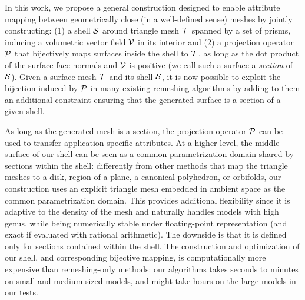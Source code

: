 In this work, we propose a general construction designed to enable attribute mapping between geometrically close (in a well-defined sense) meshes by jointly constructing: (1) a shell $\S$ around triangle mesh $\T$ spanned by a set of prisms, inducing a volumetric vector field $\V$ in its interior and (2) a projection operator $\P$ that bijectively maps surfaces inside the shell to $\T$, as long as the dot product of the surface face normals and $\V$ is positive
(we call such a surface a \emph{section} of $\S$).
Given a surface mesh $\T$ and its shell $\S$, it is now possible to exploit the bijection induced by $\P$ in many existing remeshing algorithms by adding to them an additional constraint ensuring that the generated surface is a section of a given shell.

As long as the generated mesh is a section, the projection operator $\P$ can be used to transfer application-specific attributes. At a higher level, the middle surface of our shell can be seen as a common parametrization domain shared by sections within the shell: differently from other methods that map the triangle meshes to a disk, region of a plane, a canonical polyhedron, or orbifolds, our construction uses an explicit triangle mesh embedded in ambient space as the common parametrization domain.
This provides additional flexibility since it is adaptive to the density of the mesh and naturally handles models with high genus, while being numerically stable under floating-point representation (and exact if evaluated with rational arithmetic). The downside is that it is defined only for sections contained within the shell. {
    The construction and optimization of our shell, and corresponding bijective mapping, is computationally more expensive than remeshing-only methods: our algorithms takes seconds to minutes on small and medium sized models, and might take hours on the large models in our tests.}

